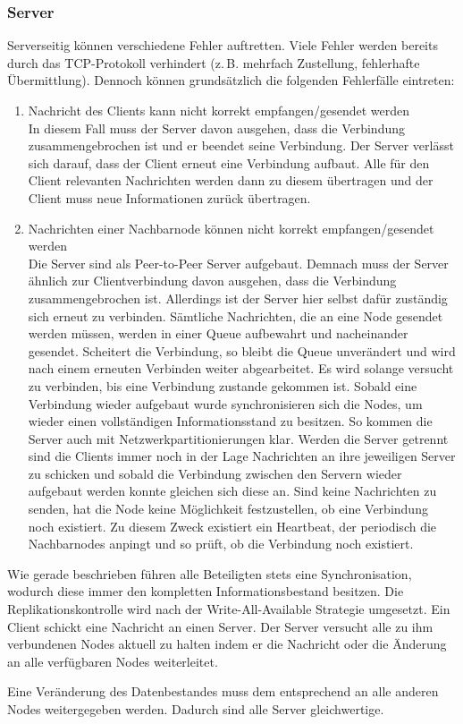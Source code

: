 \subsubsection{Server}
Serverseitig können verschiedene Fehler auftretten. Viele Fehler werden bereits durch das TCP-Protokoll verhindert (z.\,B. mehrfach Zustellung, fehlerhafte Übermittlung).
Dennoch können grundsätzlich die folgenden Fehlerfälle eintreten:
\begin{enumerate}
    \item Nachricht des Clients kann nicht korrekt empfangen/gesendet werden\\
        In diesem Fall muss der Server davon ausgehen, dass die Verbindung zusammengebrochen ist und er beendet seine Verbindung. Der Server verlässt sich darauf, dass der Client erneut eine Verbindung aufbaut.
    Alle für den Client relevanten Nachrichten werden dann zu diesem übertragen und der Client muss neue Informationen zurück übertragen.
    \item Nachrichten einer Nachbarnode können nicht korrekt empfangen/gesendet werden\\
        Die Server sind als Peer-to-Peer Server aufgebaut. Demnach muss der Server ähnlich zur Clientverbindung davon ausgehen, dass die Verbindung zusammengebrochen ist.
        Allerdings ist der Server hier selbst dafür zuständig sich erneut zu verbinden. Sämtliche Nachrichten, die an eine Node gesendet werden müssen, werden in einer Queue aufbewahrt und nacheinander gesendet.
        Scheitert die Verbindung, so bleibt die Queue unverändert und wird nach einem erneuten Verbinden weiter abgearbeitet. Es wird solange versucht zu verbinden, bis eine Verbindung zustande gekommen ist.
        Sobald eine Verbindung wieder aufgebaut wurde synchronisieren sich die Nodes, um wieder einen vollständigen Informationsstand zu besitzen. So kommen die Server auch mit Netzwerkpartitionierungen klar. Werden die Server getrennt sind die Clients immer noch in der Lage Nachrichten an ihre jeweiligen Server zu schicken und sobald die Verbindung zwischen den Servern wieder aufgebaut werden konnte gleichen sich diese an.
        Sind keine Nachrichten zu senden, hat die Node keine Möglichkeit festzustellen, ob eine Verbindung noch existiert. Zu diesem Zweck existiert ein Heartbeat, der periodisch die Nachbarnodes anpingt und so prüft, ob die Verbindung noch existiert.
\end{enumerate}
Wie gerade beschrieben führen alle Beteiligten stets eine Synchronisation, wodurch diese immer den kompletten Informationsbestand besitzen. Die Replikationskontrolle wird nach der Write-All-Available Strategie umgesetzt. Ein Client schickt eine Nachricht an einen Server. Der Server versucht alle zu ihm verbundenen Nodes aktuell zu halten indem er die Nachricht oder die Änderung an alle verfügbaren Nodes weiterleitet.

Eine Veränderung des Datenbestandes muss dem entsprechend an alle anderen Nodes weitergegeben werden.
Dadurch sind alle Server gleichwertige.
